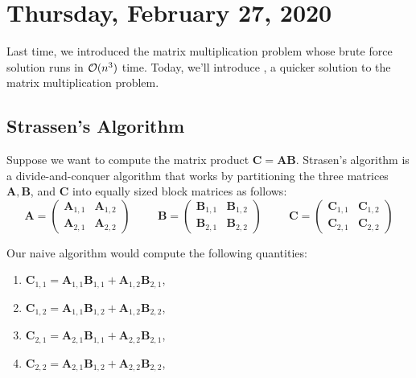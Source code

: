 \newpage
\section{Thursday, February 27, 2020}
Last time, we introduced the matrix multiplication problem whose brute force solution runs in $\mathcal{O}(n^3)$ time. Today, we'll introduce , a quicker solution to the matrix multiplication problem.


\subsection{Strassen's Algorithm}

Suppose we want to compute the matrix product $\mathbf{C} = \mathbf{A}\mathbf{B}$. Strasen's algorithm is a divide-and-conquer algorithm that works by partitioning the three matrices $\mathbf{A}, \mathbf{B}$, and $\mathbf{C}$ into equally sized block matrices as follows: \\

\[
\mathbf{A} = \begin{pmatrix}
\mathbf{A}_{1,1} & \mathbf{A}_{1,2} \\
\mathbf{A}_{2, 1} & \mathbf{A}_{2,2}
\end{pmatrix} \hspace{1cm} 
\mathbf{B} = \begin{pmatrix}
\mathbf{B}_{1,1} & \mathbf{B}_{1,2} \\
\mathbf{B}_{2, 1} & \mathbf{B}_{2,2}
\end{pmatrix} \hspace{1cm} 
\mathbf{C} = \begin{pmatrix}
\mathbf{C}_{1,1} & \mathbf{C}_{1,2} \\
\mathbf{C}_{2, 1} & \mathbf{C}_{2,2}
\end{pmatrix} 
\]


Our naive algorithm would compute the following quantities:

\begin{enumerate}
    \item $\mathbf{C}_{1,1} = \mathbf{A}_{1,1} \mathbf{B}_{1,1} + \mathbf{A}_{1,2}\mathbf{B}_{2,1}$, 
    \item $\mathbf{C}_{1,2} = \mathbf{A}_{1,1} \mathbf{B}_{1,2} + \mathbf{A}_{1,2}\mathbf{B}_{2,2}$, 
    \item $\mathbf{C}_{2,1} = \mathbf{A}_{2,1} \mathbf{B}_{1,1} + \mathbf{A}_{2,2}\mathbf{B}_{2,1}$, 
    \item $\mathbf{C}_{2,2} = \mathbf{A}_{2,1} \mathbf{B}_{1,2} + \mathbf{A}_{2,2}\mathbf{B}_{2,2}$, 
\end{enumerate}


